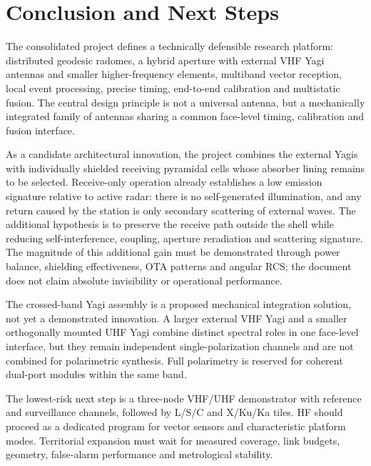 \chapter{Conclusion and Next Steps}

The consolidated project defines a technically defensible research platform: distributed geodesic radomes, a hybrid aperture with external VHF Yagi antennas and smaller higher-frequency elements, multiband vector reception, local event processing, precise timing, end-to-end calibration and multistatic fusion. The central design principle is not a universal antenna, but a mechanically integrated family of antennas sharing a common face-level timing, calibration and fusion interface.

As a candidate architectural innovation, the project combines the external Yagis with individually shielded receiving pyramidal cells whose absorber lining remains to be selected. Receive-only operation already establishes a low emission signature relative to active radar: there is no self-generated illumination, and any return caused by the station is only secondary scattering of external waves. The additional hypothesis is to preserve the receive path outside the shell while reducing self-interference, coupling, aperture reradiation and scattering signature. The magnitude of this additional gain must be demonstrated through power balance, shielding effectiveness, OTA patterns and angular RCS; the document does not claim absolute invisibility or operational performance.

The crossed-band Yagi assembly is a proposed mechanical integration solution, not yet a demonstrated innovation. A larger external VHF Yagi and a smaller orthogonally mounted UHF Yagi combine distinct spectral roles in one face-level interface, but they remain independent single-polarization channels and are not combined for polarimetric synthesis. Full polarimetry is reserved for coherent dual-port modules within the same band.

The lowest-risk next step is a three-node VHF/UHF demonstrator with reference and surveillance channels, followed by L/S/C and X/Ku/Ka tiles. HF should proceed as a dedicated program for vector sensors and characteristic platform modes. Territorial expansion must wait for measured coverage, link budgets, geometry, false-alarm performance and metrological stability.
